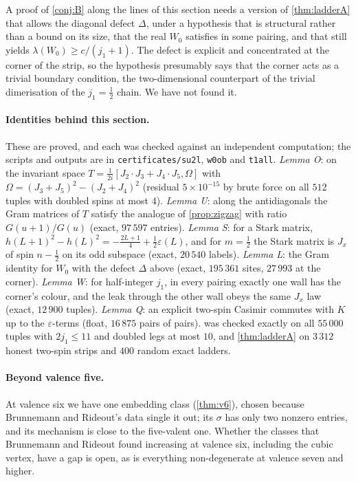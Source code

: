 A proof of \cref{conj:B} along the lines of this section needs a version of
\cref{thm:ladderA} that allows the diagonal defect $\Delta$, under a hypothesis that is
structural rather than a bound on its size, that the real $W_0$ satisfies in some
pairing, and that still yields $\lambda(W_0)\ge c/(j_1+1)$. The defect is explicit and
concentrated at the corner of the strip, so the hypothesis presumably says that the
corner acts as a trivial boundary condition, the two-dimensional counterpart of the
trivial dimerisation of the $j_1=\frac12$ chain. We have not found it.

\paragraph{Identities behind this section.}
These are proved, and each was checked against an independent computation; the
scripts and outputs are in \texttt{certificates/su2l}, \texttt{w0ob} and \texttt{t1all}.
\emph{Lemma O}: on the invariant space $T=\frac1{2i}[J_2\cdot J_3+J_4\cdot J_5,\Omega]$ with
$\Omega=(J_3+J_5)^2-(J_2+J_4)^2$ (residual $5\times10^{-15}$ by brute force on all $512$
tuples with doubled spins at most $4$). \emph{Lemma U}: along the antidiagonals the Gram
matrices of $T$ satisfy the analogue of \cref{prop:zigzag} with ratio $G(u+1)/G(u)$ (exact,
$97\,597$ entries). \emph{Lemma S}: for a Stark matrix, $h(L+1)^2-h(L)^2=
-\frac{2L+1}4+\frac12\varepsilon(L)$, and for $m=\frac12$ the Stark matrix is $J_x$ of spin
$n-\frac12$ on its odd subspace (exact, $20\,540$ labels). \emph{Lemma L}: the Gram identity
for $W_0$ with the defect $\Delta$ above (exact, $195\,361$ sites, $27\,993$ at the corner).
\emph{Lemma W}: for half-integer $j_1$, in every pairing exactly one wall has the corner's
colour, and the leak through the other wall obeys the same $J_x$ law (exact, $12\,900$
tuples). \emph{Lemma Q}: an explicit two-spin Casimir commutes with $K$ up to the
$\varepsilon$-terms (float, $16\,875$ pairs of pairs).  was checked
exactly on all $55\,000$ tuples with $2j_1\le11$ and doubled legs at most $10$, and
\cref{thm:ladderA} on $3\,312$ honest two-spin strips and $400$ random exact ladders.

\paragraph{Beyond valence five.}
At valence six we have one embedding class (\cref{thm:v6}), chosen because Brunnemann and
Rideout's data single it out; its $\sigma$ has only two nonzero entries, and its mechanism
is close to the five-valent one. Whether the classes that Brunnemann and Rideout found
increasing at valence six, including the cubic vertex, have a gap is open, as is
everything non-degenerate at valence seven and higher.

